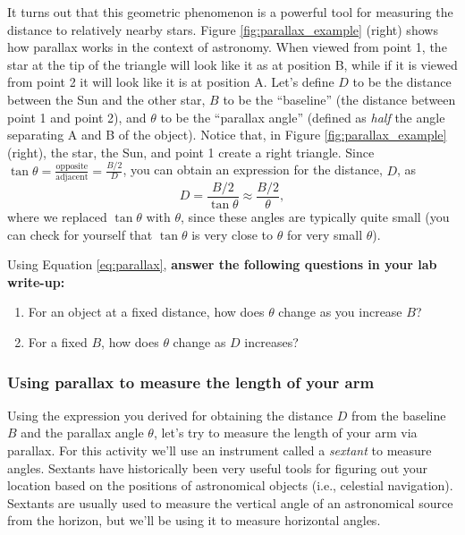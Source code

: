 \documentclass[11pt]{article}
\begin{document}
\medskip \noindent
It turns out that this geometric phenomenon is a powerful tool for measuring the distance to relatively nearby stars. Figure \ref{fig:parallax_example} (right) shows how parallax works in the context of astronomy. When viewed from point 1, the star at the tip of the triangle will look like it as at position B, while if it is viewed from point 2 it will look like it is at position A. Let's define $D$ to be the distance between the Sun and the other star, $B$ to be the ``baseline'' (the distance between point 1 and point 2), and $\theta$ to be the ``parallax angle'' (defined as \textsl{half} the angle separating A and B of the object). Notice that, in Figure \ref{fig:parallax_example} (right), the star, the Sun, and point 1 create a right triangle. Since $\tan\theta = \frac{\mathrm{opposite}}{\mathrm{adjacent}} = \frac{B/2}{D}$, you can obtain an expression for the distance, $D$, as 
\begin{equation} \label{eq:parallax}
    D = \frac{B/2}{\tan\theta} \approx \boxed{\frac{B/2}{\theta}},
\end{equation}
where we replaced $\tan\theta$ with $\theta$, since these angles are typically quite small (you can check for yourself that $\tan\theta$ is very close to $\theta$ for very small $\theta$).

\medskip \noindent
Using Equation \ref{eq:parallax}, \textbf{answer the following questions in your lab write-up:}

\begin{enumerate}
    \item For an object at a fixed distance, how does $\theta$ change as you increase $B$? 
    
    \item For a fixed $B$, how does $\theta$ change as $D$ increases?
\end{enumerate}

\subsubsection{Using parallax to measure the length of your arm}

Using the expression you derived for obtaining the distance $D$ from the baseline $B$ and the parallax angle $\theta$, let's try to measure the length of your arm via parallax. For this activity we'll use an instrument called a \emph{sextant} to measure angles. Sextants have historically been very useful tools for figuring out your location based on the positions of astronomical objects (i.e., celestial navigation). Sextants are usually used to measure the vertical angle of an astronomical source from the horizon, but we'll be using it to measure horizontal angles. 
\end{document}
